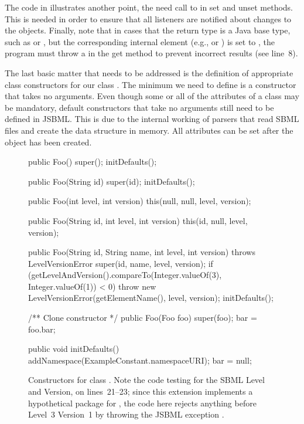 The code in  illustrates
another point, the need call to  in set and
unset methods.  This is needed in order to ensure that all listeners are
notified about changes to the objects.  Finally, note that in cases that
the return type is a Java base type, such as  or ,
but the corresponding internal element (e.g.,  or
) is set to , the program must throw a
 in the get method to prevent incorrect
results (see line~8).

The last basic matter that needs to be addressed is the definition of
appropriate class constructors for our class .  The minimum we
need to define is a constructor that takes no arguments.  Even though some
or all of the attributes of a class may be mandatory, default constructors
that take no arguments still need to be defined in JSBML.  This is due to
the internal working of parsers that read SBML files and create the data
structure in memory.  All attributes can be set after the object has been
created.

\begin{figure}[b]
  \begin{example}
public Foo() {
  super();
  initDefaults();
}

public Foo(String id) {
  super(id);
  initDefaults();
}

public Foo(int level, int version){
  this(null, null, level, version);
}

public Foo(String id, int level, int version) {
  this(id, null, level, version);
}

public Foo(String id, String name, int level, int version) throws LevelVersionError {
  super(id, name, level, version);
  if (getLevelAndVersion().compareTo(Integer.valueOf(3), Integer.valueOf(1)) < 0) {
    throw new LevelVersionError(getElementName(), level, version);
  }
  initDefaults();
}

/** Clone constructor */
public Foo(Foo foo) {
  super(foo);
  bar = foo.bar;
}

public void initDefaults() {
  addNamespace(ExampleConstant.namespaceURI);
  bar = null;
}\end{example}
  \caption{Constructors for class .  Note the code testing for
    the SBML Level and Version, on lines~21--23; since this extension
    implements a hypothetical package for \SBMLthree, the code here rejects
    anything before Level~3 Version~1 by throwing the JSBML exception
    \LevelVersionError.}
  \label{lst:ModelExtFooConstructors}
\end{figure}

